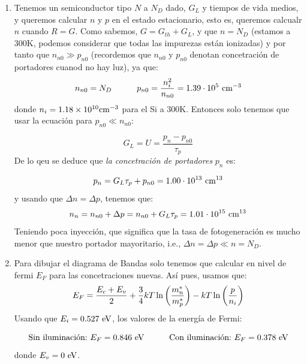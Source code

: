 \begin{enumerate}[label=\alph*)]
	\item Tenemos un semiconductor tipo $N$ a $N_D$ dado, $G_L$ y tiempos de vida medios, y queremos calcular $n$ y $p$ en el estado estacionario, esto es, queremos calcualr $n$ cuando $R=G$. Como sabemos, $G=G_{th}+G_L$, y que $n=N_D$ (estamos a 300K, podemos considerar que todas las impurezas están ionizadas) y por tanto que $n_{n0}\gg p_{n0}$ (recordemos que $n_{n0}$ y $p_{n0}$ denotan concetración de portadores cuanod no hay luz), ya que:
	\begin{equation}
		n_{n0} = N_D \quad \quad \quad p_{n0} = \frac{n_i^2}{n_{n0}} = 1.39 \cdot 10^5 \ \text{cm}^{-3}
	\end{equation}
	donde $n_i=1.18\times 10^{10} \text{cm}^{-3}$ para el Si a 300K. Entonces solo tenemos que usar la ecuación para $p_{n0}\ll n_{n0}$:

	\begin{equation}
		G_L = U = \frac{p_n-p_{n0}}{\tau_p}
	\end{equation}
	De lo qeu se deduce que \textit{la concetración de portadores} $p_n$ es:

	\begin{equation}
		p_n = G_L \tau_p + p_{n0} = 1.00 \cdot 10^{13} \ \text{cm}^{13}
	\end{equation}
	y usando que $\Delta n = \Delta p$, tenemos que: 
	\begin{equation}
		n_n = n_{n0} + \Delta p  = n_{n0} + G_L\tau_p = 1.01  \cdot 10^{15} \ \text{cm}^{13}
	\end{equation}
	Teniendo poca inyección, que significa que la tasa de fotogeneración es mucho menor que nuestro portador mayoritario, i.e., $\Delta n = \Delta p \ll n = N_D$. 
	\item Para dibujar el diagrama de Bandas solo tenemos que calcular en nivel de fermi $E_F$ para las concetraciones nuevas. Así pues, usamos que:
	\begin{equation}
		E_F = \frac{E_c+E_v}{2} + \frac{3}{4} kT \ln \left( \frac{m_n^*}{m_p^*} \right) - kT \ln \left( \frac{p}{n_i} \right)
	\end{equation}
	Usando que $E_i= 0.527 \ \text{eV}$, los valores de la energía de Fermi:

	\begin{equation}
		\text{Sin iluminación:} \ E_F = 0.846 \ \eV \tquad 
		\text{Con iluminación:} \ E_F = 0.378 \ \eV
	\end{equation}
	donde $E_v=0 \ \text{eV}$. 
\end{enumerate}


